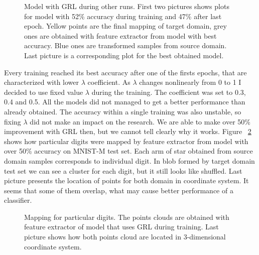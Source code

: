 \documentclass{article}
\begin{document}
\begin{figure}%
\captionsetup[subfigure]{labelformat=empty}
    \centering
    \qquad
    \qquad
    \caption{Model with GRL during other runs. First two pictures shows plots for model with 52\% accuracy during training and 47\% after last epoch. Yellow points are the final mapping of target domain, grey ones are obtained with feature extractor from model with best accuracy. Blue ones are transformed samples from source domain. Last picture is a corresponding plot for the best obtained model.}%
    \label{fig:GRL3D_2}%
\end{figure}
\par
Every training reached its best accuracy after one of the firsts epochs, that are characterized with lower $\lambda$ coefficient. As $\lambda$ changes nonlinearly from 0 to 1 I decided to use fixed value $\lambda$ during the training. The coefficient was set to 0.3, 0.4 and 0.5. All the models did not managed to get a better performance than already obtained. The accuracy within a single training was also unstable, so fixing $\lambda$ did not make an impact on the research. We are able to make over 50\% improvement with GRL then, but we cannot tell clearly why it works. Figure ~\ref{fig:GRL_digits} shows how particular digits were mapped by feature extractor from model with over 50\% accuracy on MNIST-M test set. Each arm of star obtained from source domain samples corresponds to individual digit. In blob formed by target domain test set we can see a cluster for each digit, but it still looks like shuffled. Last picture presents the location of points for both domain in coordinate system. It seems that some of them overlap, what may cause better performance of a classifier.

\begin{figure}%
    \centering
    \qquad
    \qquad
    \caption{Mapping for particular digits. The points clouds are obtained with feature extractor of model that uses GRL during training. Last picture shows how both points cloud are located in 3-dimensional coordinate system.}%
    \label{fig:GRL_digits}%
\end{figure}
\end{document}
